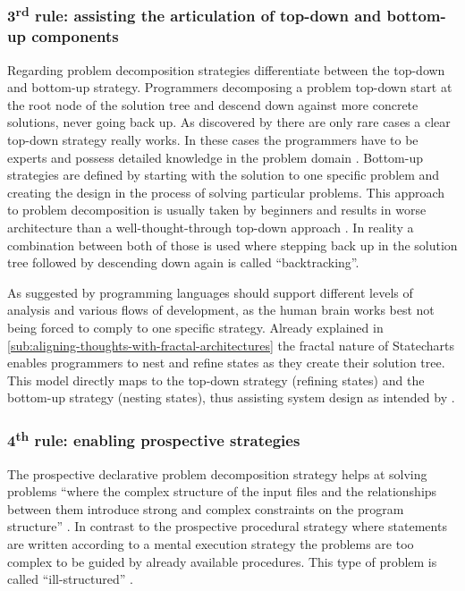 \subsubsection{3\textsuperscript{rd} rule: assisting the articulation of top-down and bottom-up components}
Regarding problem decomposition strategies \textcite{visser_expert_1990} differentiate between the top-down and bottom-up strategy.
Programmers decomposing a problem top-down start at the root node of the solution tree and descend down against more concrete solutions, never going back up.
As discovered by \textcite{brooks_towards_1977} there are only rare cases a clear top-down strategy really works.
In these cases the programmers have to be experts and possess detailed knowledge in the problem domain \autocite{dutke_mentale_1994}.
Bottom-up strategies are defined by starting with the solution to one specific problem and creating the design in the process of solving particular problems.
This approach to problem decomposition is usually taken by beginners and results in worse architecture than a well-thought-through top-down approach \autocite{visser_expert_1990}.
In reality a combination between both of those is used where stepping back up in the solution tree followed by descending down again is called ``backtracking''.

As suggested by \textcite{visser_expert_1990} programming languages should support different levels of analysis and various flows of development, as the human brain works best not being forced to comply to one specific strategy.
Already explained in \cref{sub:aligning-thoughts-with-fractal-architectures} the fractal nature of Statecharts enables programmers to nest and refine states as they create their solution tree.
This model directly maps to the top-down strategy (refining states) and the bottom-up strategy (nesting states), thus assisting system design as intended by \textcite{visser_expert_1990}.

\subsubsection{4\textsuperscript{th} rule: enabling prospective strategies}
The prospective declarative problem decomposition strategy helps at solving problems ``where the complex structure of the input files and the relationships between them introduce strong and complex constraints on the program structure'' \autocite[243]{visser_expert_1990}.
In contrast to the prospective procedural strategy where statements are written according to a mental execution strategy the problems are too complex to be guided by already available procedures.
This type of problem is called ``ill-structured'' \autocite[236]{visser_expert_1990}.

